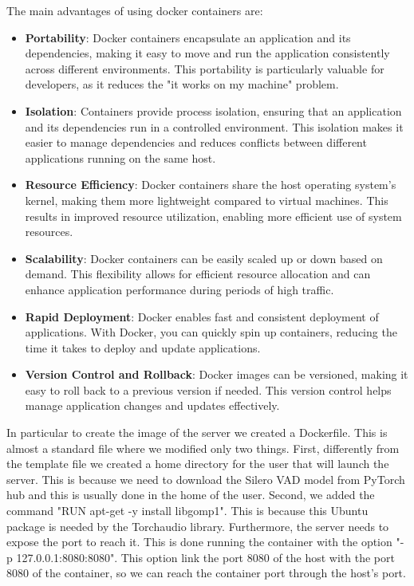 \documentclass[../main.tex]{subfiles}
\begin{document}
The main advantages of using docker containers are:

\begin{itemize}
    \item \textbf{Portability}: Docker containers encapsulate an application and its dependencies, making it easy to move and run the application consistently across different environments. This portability is particularly valuable for developers, as it reduces the "it works on my machine" problem.
    \item \textbf{Isolation}: Containers provide process isolation, ensuring that an application and its dependencies run in a controlled environment. This isolation makes it easier to manage dependencies and reduces conflicts between different applications running on the same host.
    \item \textbf{Resource Efficiency}: Docker containers share the host operating system's kernel, making them more lightweight compared to virtual machines. This results in improved resource utilization, enabling more efficient use of system resources.
    \item \textbf{Scalability}: Docker containers can be easily scaled up or down based on demand. This flexibility allows for efficient resource allocation and can enhance application performance during periods of high traffic.
    \item \textbf{Rapid Deployment}: Docker enables fast and consistent deployment of applications. With Docker, you can quickly spin up containers, reducing the time it takes to deploy and update applications.
    \item \textbf{Version Control and Rollback}: Docker images can be versioned, making it easy to roll back to a previous version if needed. This version control helps manage application changes and updates effectively.
\end{itemize}

In particular to create the image of the server we created a Dockerfile. This is almost a standard file where we modified only two things. First, differently from the template file we created a home directory for the user that will launch the server. This is because we need to download the Silero VAD model from PyTorch hub and this is usually done in the home of the user. Second, we added the command "RUN apt-get -y install libgomp1". This is because this Ubuntu package is needed by the Torchaudio library. Furthermore, the server needs to expose the port to reach it. This is done running the container with the option "-p 127.0.0.1:8080:8080". This option link the port 8080 of the host with the port 8080 of the container, so we can reach the container port through the host's port.
\end{document}
